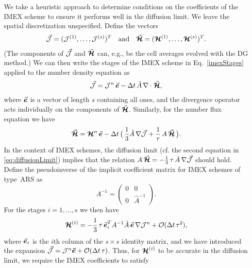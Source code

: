 We take a heuristic approach to determine conditions on the coefficients of the IMEX scheme to ensure it performs well in the diffusion limit.  
We leave the spatial discretization unspecified.  
Define the vectors 
\begin{equation}
  \vec{\mathcal{J}}=(\mathcal{J}^{(1)},\ldots,\mathcal{J}^{(s)})^{T}
  \quad\text{and}\quad
  \vec{\boldsymbol{\mathcal{H}}}=(\boldsymbol{\mathcal{H}}^{(1)},\ldots,\boldsymbol{\mathcal{H}}^{(s)})^{T}.  
\end{equation}
(The components of $\vec{\mathcal{J}}$ and $\vec{\boldsymbol{\mathcal{H}}}$ can, e.g., be the cell averages evolved with the DG method.)  
We can then write the stages of the IMEX scheme in Eq.~\eqref{imexStages} applied to the number density equation as
\begin{equation}
  \vec{\mathcal{J}}=\mathcal{J}^{n}\,\vec{\boldsymbol{e}} - \Delta t\,\tilde{A}\,\nabla\cdot\vec{\boldsymbol{\mathcal{H}}}, 
  \label{eq:numberDensityIMEX}
\end{equation}
where $\vec{\boldsymbol{e}}$ is a vector of length $s$ containing all ones, and the divergence operator acts individually on the components of $\vec{\boldsymbol{\mathcal{H}}}$.  
Similarly, for the number flux equation we have
\begin{equation}
  \vec{\boldsymbol{\mathcal{H}}}=\boldsymbol{\mathcal{H}}^{n}\,\vec{\boldsymbol{e}}-\Delta t\,\big(\,\frac{1}{3}\tilde{A}\,\nabla\vec{\mathcal{J}}+\frac{1}{\tau}\,A\,\vec{\boldsymbol{\mathcal{H}}}\,\big).
  \label{eq:numberFluxIMEX}
\end{equation}
In the context of IMEX schemes, the diffusion limit (cf. the second equation in \eqref{eq:diffusionLimit}) implies that the relation $A\,\vec{\boldsymbol{\mathcal{H}}}=-\frac{1}{3}\,\tau\,\tilde{A}\,\nabla\vec{\mathcal{J}}$ should hold.  
Define the pseudoinverse of the implicit coefficient matrix for IMEX schemes of type~ARS as
\begin{equation*}
    A^{-1}
    =\left(
        \begin{matrix}
          0 & 0 \\ 
          0 & \hat{A}^{-1}
        \end{matrix}
      \right).
\end{equation*}
For the stages $i=1,\ldots,s$ we then have
\begin{equation}
  \boldsymbol{\mathcal{H}}^{(i)}=-\frac{1}{3}\,\tau\,\vec{\boldsymbol{e}}_{i}^{T}A^{-1}\tilde{A}\,\vec{\boldsymbol{e}}\,\nabla\mathcal{J}^{n}+\mathcal{O}(\Delta t\,\tau^{2}),
\end{equation}
where $\vec{\boldsymbol{e}}_{i}$ is the $i$th column of the $s\times s$ identity matrix, and we have introduced the expansion $\vec{\mathcal{J}}=\mathcal{J}^{n}\vec{\boldsymbol{e}}+\mathcal{O}(\Delta t\,\tau)$.  
Thus, for $\boldsymbol{\mathcal{H}}^{(i)}$ to be accurate in the diffusion limit, we require the IMEX coefficients to satisfy
